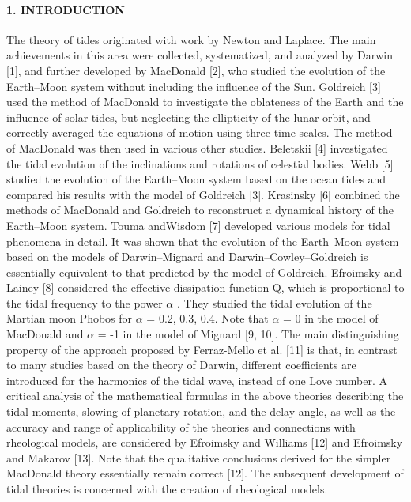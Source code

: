 \documentclass[12pt]{article}
\begin{document}
\begin{multicols}{2}
\paragraph{1. INTRODUCTION}
The theory of tides originated with work by Newton
and Laplace. The main achievements in this
area were collected, systematized, and analyzed by
Darwin [1], and further developed by MacDonald [2],
who studied the evolution of the Earth–Moon system
without including the influence of the Sun. Goldreich
[3] used the method of MacDonald to investigate the
oblateness of the Earth and the influence of solar
tides, but neglecting the ellipticity of the lunar orbit,
and correctly averaged the equations of motion using
three time scales.
The method of MacDonald was then used in various
other studies. Beletskii [4] investigated the tidal
evolution of the inclinations and rotations of celestial
bodies. Webb [5] studied the evolution of the
Earth–Moon system based on the ocean tides and
compared his results with the model of Goldreich [3].
Krasinsky [6] combined the methods of MacDonald
and Goldreich to reconstruct a dynamical history of
the Earth–Moon system. Touma andWisdom [7] developed
various models for tidal phenomena in detail.
It was shown that the evolution of the Earth–Moon
system based on the models of Darwin–Mignard and
Darwin–Cowley–Goldreich is essentially equivalent
to that predicted by the model of Goldreich.
Efroimsky and Lainey [8] considered the effective
dissipation function Q, which is proportional to the
tidal frequency to the power $\alpha$ . They studied the tidal
evolution of the Martian moon Phobos for $\alpha$ = 0.2,
0.3, 0.4. Note that $\alpha$ = 0 in the model of MacDonald
and $\alpha$ = -1 in the model of Mignard [9, 10]. The
main distinguishing property of the approach proposed
by Ferraz-Mello et al. [11] is that, in contrast to
many studies based on the theory of Darwin, different
coefficients are introduced for the harmonics of the
tidal wave, instead of one Love number. A critical
analysis of the mathematical formulas in the above
theories describing the tidal moments, slowing of
planetary rotation, and the delay angle, as well as the
accuracy and range of applicability of the theories and
connections with rheological models, are considered
by Efroimsky and Williams [12] and Efroimsky and
Makarov [13]. Note that the qualitative conclusions
derived for the simpler MacDonald theory essentially
remain correct [12].
The subsequent development of tidal theories is
concerned with the creation of rheological models.

\end{multicols}
\end{document}
